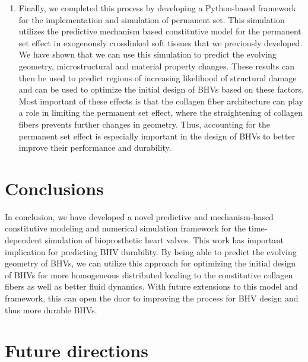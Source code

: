 \begin{enumerate}
        \item Finally, we completed this process by developing a Python-based framework for the implementation and simulation of permanent set. This simulation utilizes the predictive mechanism based constitutive model for the permanent set effect in exogenously crosslinked soft tissues that we previously developed. We have shown that we can use this simulation to predict the evolving geometry, microstructural and material property changes. These results can then be used to predict regions of increasing likelihood of structural damage and can be used to optimize the initial design of BHVs based on these factors. Most important of these effects is that the collagen fiber architecture can play a role in limiting the permanent set effect, where the straightening of collagen fibers prevents further changes in geometry. Thus, accounting for the permanent set effect is especially important in the design of BHVs to better improve their performance and durability. 
    \end{enumerate}
    
\section{Conclusions}

    In conclusion, we have developed a novel predictive and mechanism-based constitutive modeling and numerical simulation framework for the time-dependent simulation of bioprosthetic heart valves. This work has important implication for predicting BHV durability. By being able to predict the evolving geometry of BHVs, we can utilize this approach for optimizing the initial design of BHVs for more homogeneous distributed loading to the constitutive collagen fibers as well as better fluid dynamics. With future extensions to this model and framework, this can open the door to improving the process for BHV design and thus more durable BHVs. 


    
\section{Future directions}
    
